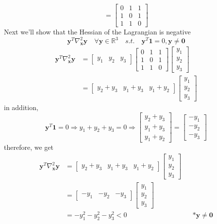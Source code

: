 \documentclass{article}
\begin{document}
\begin{enumerate}[(a)]
\[ = 
 \begin{bmatrix} 
 0& 1 & 1 \\
  1& 0 & 1 \\
   1& 1 & 0 
 \end{bmatrix}
 \]
Next we'll show that the Hessian of the Lagrangian is negative
\[\mathbf{y}^T\nabla_{\mathbf{x}}^2\mathbf{y} \quad \forall \mathbf{y}\in \mathbb{R}^3 \quad s.t. \quad \mathbf{y}^T\mathbf{1} = 0 , \mathbf{y}\ne \mathbf{0} \]
\begin{align*}
\mathbf{y}^T\nabla_{\mathbf{x}}^2\mathbf{y} &= 
 \begin{bmatrix} 
 y_1& y_2 & y_3 
 \end{bmatrix}
 \begin{bmatrix} 
  0& 1 & 1 \\
   1& 0 & 1 \\
    1& 1 & 0 
  \end{bmatrix}
   \begin{bmatrix} 
   y_1\\ y_2 \\ y_3 
   \end{bmatrix} \\ 
   &=
\begin{bmatrix} 
 y_2+y_3& y_1+y_3 & y_1+y_2 
 \end{bmatrix}
\begin{bmatrix} 
   y_1\\ y_2 \\ y_3 
   \end{bmatrix} 
\end{align*}
in addition,
\[\mathbf{y}^T\mathbf{1} = 0 \Rightarrow y_1+y_2+y_3 = 0 \Rightarrow 
\begin{bmatrix} 
 y_2+y_3\\ y_1+y_3 \\ y_1+y_2 
 \end{bmatrix}
 =
 \begin{bmatrix} 
    -y_1\\ -y_2 \\ -y_3 
    \end{bmatrix} 
\]
therefore, we get
\begin{align*}
\mathbf{y}^T\nabla_{\mathbf{x}}^2\mathbf{y}
&=
\begin{bmatrix}
 y_2+y_3& y_1+y_3 & y_1+y_2
 \end{bmatrix}
\begin{bmatrix}
   y_1\\ y_2 \\ y_3
   \end{bmatrix} \\
&=
\begin{bmatrix}
 -y_1& -y_2 & -y_3
 \end{bmatrix}
\begin{bmatrix}
   y_1\\ y_2 \\ y_3
   \end{bmatrix} \\
   &= -y_1^2 -y_2^2 -y_3^2 < 0 && *\mathbf{y}\ne \mathbf{0}
\end{align*}
\end{enumerate}
\end{document}
